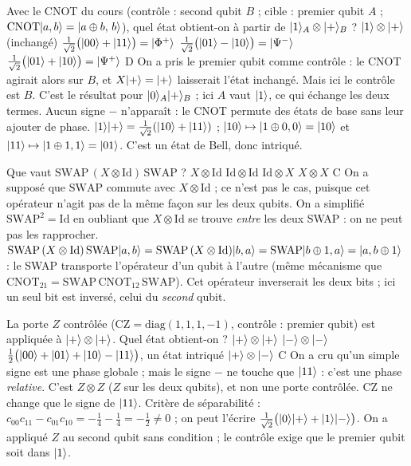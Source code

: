   {Avec le CNOT du cours (contrôle : second qubit $B$ ; cible : premier qubit $A$ ; $\mathrm{CNOT}|a,b\rangle=|a\oplus b,\,b\rangle$), quel état obtient-on à partir de $|1\rangle_A\otimes|+\rangle_B$ ?}
  {$|1\rangle\otimes|+\rangle$ (inchangé)}
  {$\frac{1}{\sqrt2}\big(|00\rangle+|11\rangle\big)=|\Phi^+\rangle$}
  {$\frac{1}{\sqrt2}\big(|01\rangle-|10\rangle\big)=|\Psi^-\rangle$}
  {$\frac{1}{\sqrt2}\big(|01\rangle+|10\rangle\big)=|\Psi^+\rangle$}
  {D}
\qcmx
  {On a pris le premier qubit comme contrôle : le CNOT agirait alors sur $B$, et $X|+\rangle=|+\rangle$ laisserait l'état inchangé. Mais ici le contrôle est $B$.}
  {C'est le résultat pour $|0\rangle_A|+\rangle_B$ ; ici $A$ vaut $|1\rangle$, ce qui échange les deux termes.}
  {Aucun signe $-$ n'apparaît : le CNOT permute des états de base sans leur ajouter de phase.}
  {$|1\rangle|+\rangle=\frac1{\sqrt2}(|10\rangle+|11\rangle)$ ; $|10\rangle\mapsto|1\oplus0,0\rangle=|10\rangle$ et $|11\rangle\mapsto|1\oplus1,1\rangle=|01\rangle$. C'est un état de Bell, donc intriqué.}

  {Que vaut $\mathrm{SWAP}\,(X\otimes\mathrm{Id})\,\mathrm{SWAP}$ ?}
  {$X\otimes\mathrm{Id}$}
  {$\mathrm{Id}\otimes\mathrm{Id}$}
  {$\mathrm{Id}\otimes X$}
  {$X\otimes X$}
  {C}
\qcmx
  {On a supposé que $\mathrm{SWAP}$ commute avec $X\otimes\mathrm{Id}$ ; ce n'est pas le cas, puisque cet opérateur n'agit pas de la même façon sur les deux qubits.}
  {On a simplifié $\mathrm{SWAP}^2=\mathrm{Id}$ en oubliant que $X\otimes\mathrm{Id}$ se trouve \emph{entre} les deux SWAP : on ne peut pas les rapprocher.}
  {$\mathrm{SWAP}\,(X\otimes\mathrm{Id})\,\mathrm{SWAP}|a,b\rangle=\mathrm{SWAP}\,(X\otimes\mathrm{Id})|b,a\rangle=\mathrm{SWAP}|b\oplus1,a\rangle=|a,b\oplus1\rangle$ : le SWAP transporte l'opérateur d'un qubit à l'autre (même mécanisme que $\mathrm{CNOT}_{21}=\mathrm{SWAP}\,\mathrm{CNOT}_{12}\,\mathrm{SWAP}$).}
  {Cet opérateur inverserait les deux bits ; ici un seul bit est inversé, celui du \emph{second} qubit.}

  {La porte $Z$ contrôlée ($\mathrm{CZ}=\mathrm{diag}(1,1,1,-1)$, contrôle : premier qubit) est appliquée à $|+\rangle\otimes|+\rangle$. Quel état obtient-on ?}
  {$|+\rangle\otimes|+\rangle$}
  {$|-\rangle\otimes|-\rangle$}
  {$\frac12\big(|00\rangle+|01\rangle+|10\rangle-|11\rangle\big)$, un état intriqué}
  {$|+\rangle\otimes|-\rangle$}
  {C}
\qcmx
  {On a cru qu'un simple signe est une phase globale ; mais le signe $-$ ne touche que $|11\rangle$ : c'est une phase \emph{relative}.}
  {C'est $Z\otimes Z$ ($Z$ sur les deux qubits), et non une porte contrôlée.}
  {CZ ne change que le signe de $|11\rangle$. Critère de séparabilité : $c_{00}c_{11}-c_{01}c_{10}=-\frac14-\frac14=-\frac12\neq0$ ; on peut l'écrire $\frac{1}{\sqrt2}\big(|0\rangle|+\rangle+|1\rangle|-\rangle\big)$.}
  {On a appliqué $Z$ au second qubit sans condition ; le contrôle exige que le premier qubit soit dans $|1\rangle$.}

